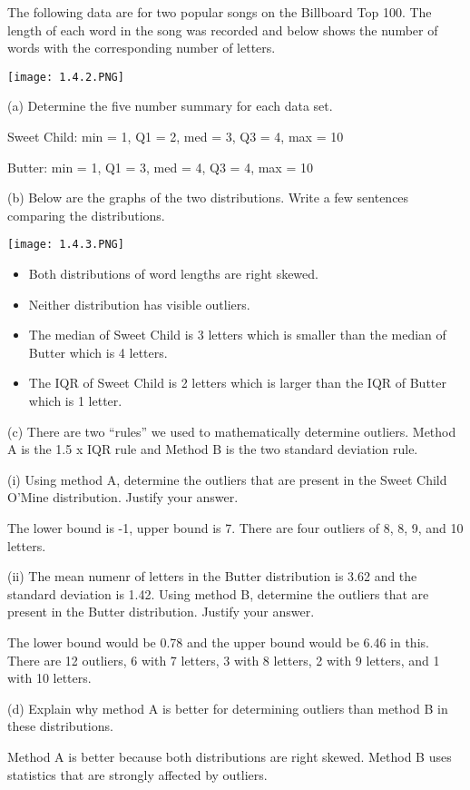 \documentclass[../stats.tex]{subfiles}
\begin{document}
\pagebreak
\begin{example}
    The following data are for two popular songs on the Billboard Top 100. The length of each word in the song was recorded and below shows the number of words with the corresponding number of letters.
    \begin{center}
        \texttt{[image: 1.4.2.PNG]}
    \end{center}
    (a) Determine the five number summary for each data set.

    Sweet Child: min = 1, Q1 = 2, med = 3, Q3 = 4, max = 10 

    Butter: min = 1, Q1 = 3, med = 4, Q3 = 4, max = 10

    (b) Below are the graphs of the two distributions. Write a few sentences comparing the distributions.
    \begin{center}
        \texttt{[image: 1.4.3.PNG]}
    \end{center}
    \begin{itemize}
        \item Both distributions of word lengths are right skewed.
        \item Neither distribution has visible outliers.
        \item The median of Sweet Child is 3 letters which is smaller than the median of Butter which is 4 letters.
        \item The IQR of Sweet Child is 2 letters which is larger than the IQR of Butter which is 1 letter.
    \end{itemize}

    (c) There are two ``rules'' we used to mathematically determine outliers. Method A is the 1.5 x IQR rule and Method B is the two standard deviation rule.
    
    (i) Using method A, determine the outliers that are present in the Sweet Child O'Mine distribution. Justify your answer.

    The lower bound is -1, upper bound is 7. There are four outliers of 8, 8, 9, and 10 letters.

    (ii) The mean numenr of letters in the Butter distribution is 3.62 and the standard deviation is 1.42. Using method B, determine the outliers that are present in the Butter distribution. Justify your answer.

    The lower bound would be 0.78 and the upper bound would be 6.46 in this. There are 12 outliers, 6 with 7 letters, 3 with 8 letters, 2 with 9 letters, and 1 with 10 letters.

    (d) Explain why method A is better for determining outliers than method B in these distributions.

    Method A is better because both distributions are right skewed. Method B uses statistics that are strongly affected by outliers.
\end{example}
\end{document}
